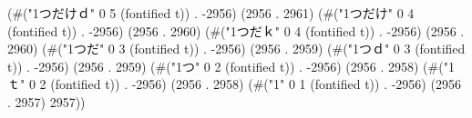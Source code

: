 (#("1つだけｄ" 0 5 (fontified t)) . -2956) (2956 . 2961) (#("1つだけ" 0 4 (fontified t)) . -2956) (2956 . 2960) (#("1つだｋ" 0 4 (fontified t)) . -2956) (2956 . 2960) (#("1つだ" 0 3 (fontified t)) . -2956) (2956 . 2959) (#("1つｄ" 0 3 (fontified t)) . -2956) (2956 . 2959) (#("1つ" 0 2 (fontified t)) . -2956) (2956 . 2958) (#("1ｔ" 0 2 (fontified t)) . -2956) (2956 . 2958) (#("1" 0 1 (fontified t)) . -2956) (2956 . 2957) 2957))
